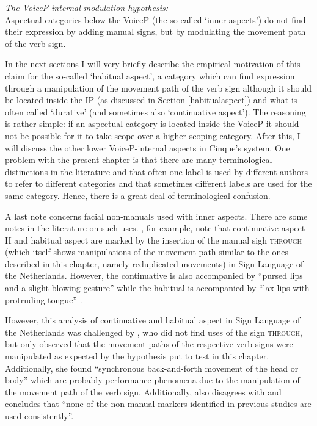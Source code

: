 \begin{exe}
\ex \textit{The VoiceP-internal modulation hypothesis:}\\
Aspectual categories below the VoiceP (the so-called `inner aspects') do not find their expression by adding manual signs, but by modulating the movement path of the verb sign. \label{vpinternalmodhypa}
\end{exe}


\noindent In the next sections I will very briefly describe the empirical motivation of this claim for the so-called `habitual aspect', a category which can find expression through a manipulation of the movement path of the verb sign although it should be located inside the IP (as discussed in Section \ref{habitualaspect}) and what is often called `durative' (and sometimes also `continuative aspect'). The reasoning is rather simple: if an aspectual category is located inside the VoiceP it should not be possible for it to take scope over a higher-scoping category. After this, I will discuss the other lower VoiceP-internal aspects in Cinque's system. One problem with the present chapter is that there are many terminological distinctions in the literature and that often one label is used by different authors to refer to different categories and that sometimes different labels are used for the same category. Hence, there is a great deal of terminological confusion.

A last note concerns facial non-manuals used with inner aspects. There are some notes in the literature on such uses. \citet{hoitingslobin2001typological}, for example, note that continuative aspect II and habitual aspect are marked by the insertion of the manual sigh \textsc{through} (which itself shows manipulations of the movement path similar to the ones described in this chapter, namely reduplicated movements) in Sign Language of the Netherlands. However, the continuative is also accompanied by ``pursed lips and a slight blowing gesture'' while the habitual is accompanied by ``lax lips with protruding tongue'' \citep[127]{hoitingslobin2001typological}.

However, this analysis of continuative and habitual aspect in Sign Language of the Netherlands was challenged by \citet{oomen2016aspectual}, who did not find uses of the sign \textsc{through}, but only observed that the movement paths of the respective verb signs were manipulated as expected by the hypothesis put to test in this chapter. Additionally, she found ``synchronous back-and-forth movement of the head or body'' \citep[43]{oomen2016aspectual} which are probably performance phenomena due to the manipulation of the movement path of the verb sign. Additionally, \citet[17]{boven2018throughaspect} also disagrees with \citet{hoitingslobin2001typological} and concludes that ``none of the non-manual markers identified in previous studies are  used  consistently''.%


